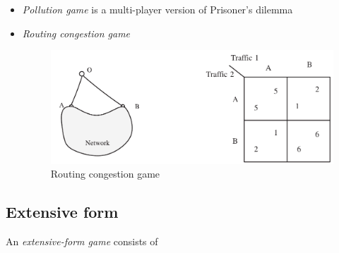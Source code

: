 \begin{itemize}
  \item \emph{Pollution game} is a multi-player version of Prisoner's dilemma \todo

  \item \emph{Routing congestion game}

    \begin{figure}
      \centering
      \includegraphics[width=0.65\paperwidth]{../img/routing-congestion-game.png}
      \caption{Routing congestion game}
      \label{fig:routing-congestion}
    \end{figure}

\end{itemize}

\subsection{Extensive form}
\label{ssec:extensive-form}

An \emph{extensive-form game} consists of

